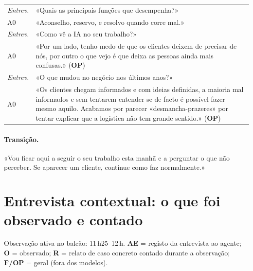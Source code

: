 \documentclass[11pt,a4paper]{article}
\begin{document}
\begin{tabularx}{\textwidth}{@{}p{1.6cm}L@{}}
\toprule
\textit{Entrev.} & «Quais as principais funções que desempenha?» \\
A0 & «Aconselho, reservo, e resolvo quando corre mal.» \\
\textit{Entrev.} & «Como vê a IA no seu trabalho?» \\
A0 & «\textcolor{formal}{Por um lado, tenho medo de que os clientes deixem de precisar de nós, por outro
o que vejo é que deixa as pessoas ainda mais confusas.}» (\textbf{OP}) \\
\textit{Entrev.} & «O que mudou no negócio nos últimos anos?» \\
A0 & «\textcolor{formal}{Os clientes chegam informados e com ideias definidas, 
a maioria mal informados e sem tentarem entender se de facto é possível fazer mesmo aquilo.
Acabamos por parecer «desmancha-prazeres» por tentar explicar que a logística não tem grande sentido.}» (\textbf{OP}) \\
\bottomrule
\end{tabularx}

\paragraph{Transição.} «Vou ficar aqui a seguir o seu trabalho esta manhã e a perguntar o que não perceber. Se aparecer um cliente, continue como faz normalmente.»

\section{Entrevista contextual: o que foi observado e contado}
Observação ativa no balcão: 11\,h25--12\,h. \textbf{AE} = registo da entrevista ao agente; \textbf{O} = observado; \textbf{R} = relato de caso concreto contado durante a observação; \textbf{F/OP} = geral (fora dos modelos).
\end{document}
